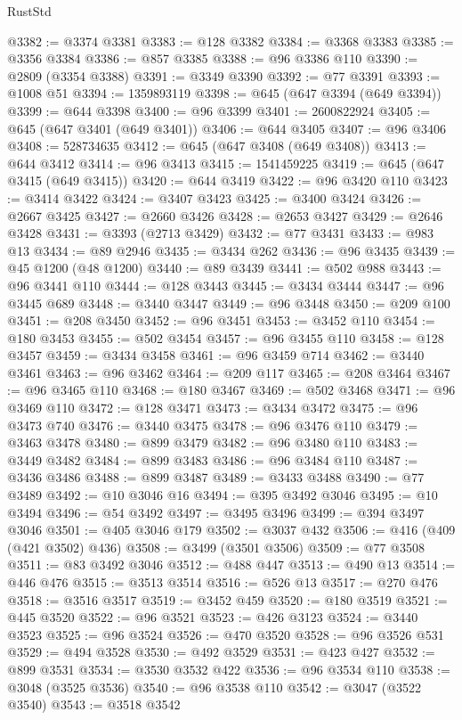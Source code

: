 \begin{lexlean}{RustStd}
\begin{coremodule}
{\begin{coremodule}
{{{{{{{{{{{{{{{{{{{{{{{{{{{{{{{{{{{{{{{{{{{{{{{{{{{{{{{{{{{{@3382 := @3374 @3381
@3383 := @128 @3382
@3384 := @3368 @3383
@3385 := @3356 @3384
@3386 := @857 @3385
@3388 := @96 @3386 @110
@3390 := @2809 (@3354 @3388)
@3391 := @3349 @3390
@3392 := @77 @3391
@3393 := @1008 @51
@3394 := 1359893119
@3398 := @645 (@647 @3394 (@649 @3394))
@3399 := @644 @3398
@3400 := @96 @3399
@3401 := 2600822924
@3405 := @645 (@647 @3401 (@649 @3401))
@3406 := @644 @3405
@3407 := @96 @3406
@3408 := 528734635
@3412 := @645 (@647 @3408 (@649 @3408))
@3413 := @644 @3412
@3414 := @96 @3413
@3415 := 1541459225
@3419 := @645 (@647 @3415 (@649 @3415))
@3420 := @644 @3419
@3422 := @96 @3420 @110
@3423 := @3414 @3422
@3424 := @3407 @3423
@3425 := @3400 @3424
@3426 := @2667 @3425
@3427 := @2660 @3426
@3428 := @2653 @3427
@3429 := @2646 @3428
@3431 := @3393 (@2713 @3429)
@3432 := @77 @3431
@3433 := @983 @13
@3434 := @89 @2946
@3435 := @3434 @262
@3436 := @96 @3435
@3439 := @45 @1200 (@48 @1200)
@3440 := @89 @3439
@3441 := @502 @988
@3443 := @96 @3441 @110
@3444 := @128 @3443
@3445 := @3434 @3444
@3447 := @96 @3445 @689
@3448 := @3440 @3447
@3449 := @96 @3448
@3450 := @209 @100
@3451 := @208 @3450
@3452 := @96 @3451
@3453 := @3452 @110
@3454 := @180 @3453
@3455 := @502 @3454
@3457 := @96 @3455 @110
@3458 := @128 @3457
@3459 := @3434 @3458
@3461 := @96 @3459 @714
@3462 := @3440 @3461
@3463 := @96 @3462
@3464 := @209 @117
@3465 := @208 @3464
@3467 := @96 @3465 @110
@3468 := @180 @3467
@3469 := @502 @3468
@3471 := @96 @3469 @110
@3472 := @128 @3471
@3473 := @3434 @3472
@3475 := @96 @3473 @740
@3476 := @3440 @3475
@3478 := @96 @3476 @110
@3479 := @3463 @3478
@3480 := @899 @3479
@3482 := @96 @3480 @110
@3483 := @3449 @3482
@3484 := @899 @3483
@3486 := @96 @3484 @110
@3487 := @3436 @3486
@3488 := @899 @3487
@3489 := @3433 @3488
@3490 := @77 @3489
@3492 := @10 @3046 @16
@3494 := @395 @3492 @3046
@3495 := @10 @3494
@3496 := @54 @3492
@3497 := @3495 @3496
@3499 := @394 @3497 @3046
@3501 := @405 @3046 @179
@3502 := @3037 @432
@3506 := @416 (@409 (@421 @3502) @436)
@3508 := @3499 (@3501 @3506)
@3509 := @77 @3508
@3511 := @83 @3492 @3046
@3512 := @488 @447
@3513 := @490 @13
@3514 := @446 @476
@3515 := @3513 @3514
@3516 := @526 @13
@3517 := @270 @476
@3518 := @3516 @3517
@3519 := @3452 @459
@3520 := @180 @3519
@3521 := @445 @3520
@3522 := @96 @3521
@3523 := @426 @3123
@3524 := @3440 @3523
@3525 := @96 @3524
@3526 := @470 @3520
@3528 := @96 @3526 @531
@3529 := @494 @3528
@3530 := @492 @3529
@3531 := @423 @427
@3532 := @899 @3531
@3534 := @3530 @3532 @422
@3536 := @96 @3534 @110
@3538 := @3048 (@3525 @3536)
@3540 := @96 @3538 @110
@3542 := @3047 (@3522 @3540)
@3543 := @3518 @3542
}}}}}}}}}}}}}}}}}}}}}}}}}}}}}}}}}}}}}}}}}}}}}}}}}}}}}}}}}}}}
\end{coremodule}}
\end{coremodule}
\end{lexlean}
